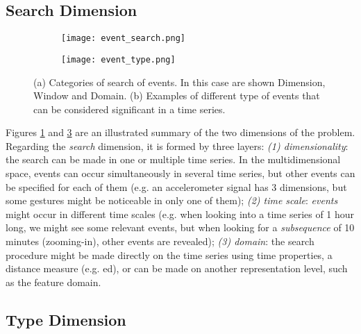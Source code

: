 \subsection{Search Dimension}

\begin{figure}
\begin{subfigure}{.5\textwidth}
	\centering
	\texttt{[image: event\_search.png]}
	\label{fig:event_search}
	\caption{}
\end{subfigure}%
\begin{subfigure}{.5\textwidth}
	\centering
	\texttt{[image: event\_type.png]}
	\label{fig:event_type}
	\caption{}
\end{subfigure}
\caption{(a) Categories of search of events. In this case are shown Dimension, Window and Domain. (b) Examples of different type of events that can be considered significant in a time series.}
\end{figure}

Figures \ref{fig:event_search} and \ref{fig:event_type} are an illustrated summary of the two dimensions of the problem. Regarding the \textit{search} dimension, it is formed by three layers: \textit{(1) dimensionality}: the search can be made in one or multiple time series. In the multidimensional space, events can occur simultaneously in several time series, but other events can be specified for each of them (e.g. an accelerometer signal has 3 dimensions, but some gestures might be noticeable in only one of them); \textit{(2) time scale}: \textit{events} might occur in different time scales (e.g. when looking into a time series of 1 hour long, we might see some relevant events, but when looking for a \textit{subsequence} of 10 minutes (zooming-in), other events are revealed); \textit{(3) domain}: the search procedure might be made directly on the time series using time properties, a distance measure (e.g. \gls{ed}), or can be made on another representation level, such as the feature domain.

\subsection{Type Dimension}

